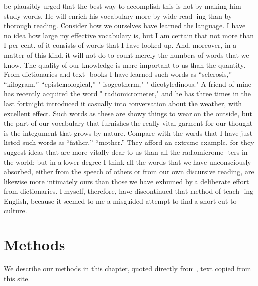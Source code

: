 \documentclass[]{book}
\begin{document}
be plausibly urged that the best way to accomplish this is not by making
him study words. He will enrich his vocabulary more by wide read- ing
than by thorough reading. Consider how we ourselves have learned the
language. I have no idea how large my effective vocabulary is, but I am
certain that not more than I per cent. of it consists of words that I
have looked up. And, moreover, in a matter of this kind, it will not do
to count merely the numbers of words that we know. The quality of our
knowledge is more important to us than the quantity. From dictionaries
and text- books I have learned such words as ``sclerosis,''
``kilogram,'' ``epistemological,'' " isogeotherm," " dicotyledinous." A
friend of mine has recently acquired the word " radiomicrometer," and he
has three times in the last fortnight introduced it casually into
conversation about the weather, with excellent effect. Such words as
these are showy things to wear on the outside, but the part of our
vocabulary that furnishes the really vital garment for our thought is
the integument that grows by nature. Compare with the words that I have
just listed such words as ``father,'' ``mother.'' They afford an extreme
example, for they suggest ideas that are more vitally dear to us than
all the radiomicrome- ters in the world; but in a lower degree I think
all the words that we have unconsciously absorbed, either from the
speech of others or from our own discursive reading, are likewise more
intimately ours than those we have exhumed by a deliberate effort from
dictionaries. I myself, therefore, have discontinued that method of
teach- ing English, because it seemed to me a misguided attempt to find
a short-cut to culture.

\hypertarget{methods}{%
\chapter{Methods}\label{methods}}

We describe our methods in this chapter, quoted directly from
\citep{rowling_harry_2000}, text copied from
\href{http://www.e-bookstoread.com/2017/Harry_Potter_Series_2/index_12.html}{this
site}.
\end{document}
